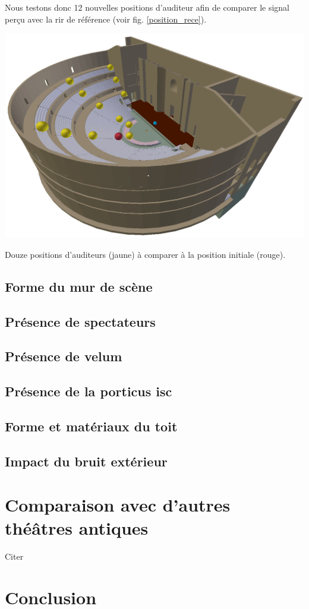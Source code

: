 Nous testons donc 12 nouvelles positions d'auditeur afin de comparer le signal perçu avec la \gls{rir} de référence (voir fig. \ref{position_rece}).
\begin{figureth}
	\includegraphics[width=0.8\linewidth]{images/position_rece}
	\caption{Douze positions d'auditeurs (jaune) à comparer à la position initiale (rouge).}
	\label{position_rece}
\end{figureth}
		

\section{Forme du mur de scène}	
\section{Présence de spectateurs}
\cite[p.212]{jouhaneau}
\section{Présence de velum}
\section{Présence de la \gls{porticus isc}}
\section{Forme et matériaux du toit}
\section{Impact du bruit extérieur}

\newpage

\chapter{Comparaison avec d'autres théâtres antiques}
\minitoc
\newpage

Citer  \cite[p.25]{rindel}

\chapter*{Conclusion}

\newpage

 
 
